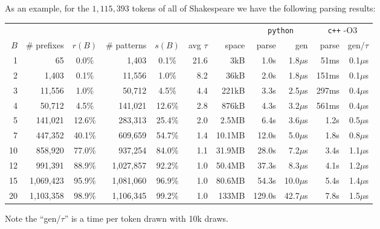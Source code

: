\documentclass[11pt, oneside]{amsart}   	%
\begin{document}
As an example, for the $1,115,393$ tokens of all of Shakespeare we have the following parsing results:
\begin{center}
\begin{small}
\begin{tabular}{ r r c r c r r r r r r}
        &                  &             &                   &             &                   &      & \multicolumn{2}{c}{\texttt{python}} & \multicolumn{2}{c}{\texttt{c++} -O3} \\ \cline{8-9} \cline{10-11}
 $B$ & \# prefixes & $r(B)$ & \# patterns & $s(B)$ & avg $\tau$ & space & parse & gen & parse & gen/$\tau$ \\ \hline
 1 & 65 & 0.0\% & 1,403 & 0.1\% & 21.6 & 3kB & 1.0s & 1.8$\mu$s & 51ms & 0.1$\mu$s \\  
 2 & 1,403 & 0.1\% & 11,556 & 1.0\% & 8.2 & 36kB & 2.0s & 1.8$\mu$s & 151ms & 0.1$\mu$s \\  
 3 & 11,556 & 1.0\% & 50,712 & 4.5\% & 4.4 & 221kB & 3.3s & 2.5$\mu$s & 297ms & 0.4$\mu$s \\
 4 & 50,712 & 4.5\% & 141,021 & 12.6\% & 2.8 & 876kB & 4.3s & 3.2$\mu$s & 561ms & 0.4$\mu$s \\
 5 & 141,021 & 12.6\% & 283,313 & 25.4\% & 2.0 & 2.5MB & 6.4s & 3.6$\mu$s & 1.2s & 0.5$\mu$s \\
 7 & 447,352 & 40.1\% & 609,659 & 54.7\% & 1.4 & 10.1MB & 12.0s & 5.0$\mu$s & 1.8s & 0.8$\mu$s \\
 10 & 858,920 & 77.0\% & 937,254 & 84.0\% & 1.1 & 31.9MB & 28.0s & 7.2$\mu$s & 3.4s & 1.1$\mu$s \\  
 12 & 991,391 & 88.9\% & 1,027,857 & 92.2\% & 1.0 & 50.4MB & 37.3s & 8.3$\mu$s & 4.1s & 1.2$\mu$s \\
 15 & 1,069,423 & 95.9\% & 1,081,060 & 96.9\% & 1.0 & 80.6MB & 54.3s & 10.0$\mu$s & 5.4s & 1.4$\mu$s \\  
 20 & 1,103,358 & 98.9\% & 1,106,345 & 99.2\% & 1.0 & 133MB & 129.0s & 42.7$\mu$s & 7.8s & 1.5$\mu$s \\  \hline
\end{tabular}
\end{small}
\end{center}
Note the ``gen/$\tau$'' is a time per token drawn with 10k draws. 
\end{document}
